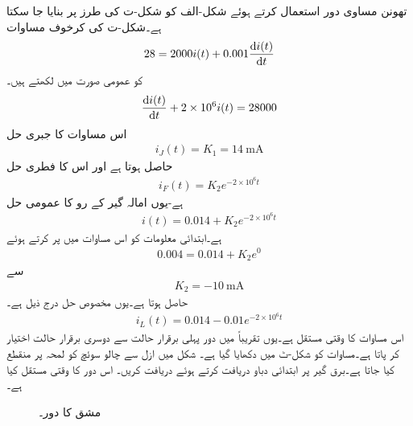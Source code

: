 تھونن مساوی دور استعمال کرتے ہوئے شکل-الف کو شکل-ت کی طرز پر بنایا جا سکتا ہے۔شکل-ت کی کرخوف مساوات
\begin{align*}
28=2000 i(t)+0.001 \frac{\dif i(t)}{\dif t}
\end{align*}
کو عمومی صورت میں لکھتے ہیں۔
\begin{align*}
\frac{\dif i(t)}{\dif t}+2\times 10^6 i(t)=28000
\end{align*}
اس مساوات کا جبری حل 
\begin{align*}
i_J(t)=K_1=\SI{14}{\milli\ampere}
\end{align*}
حاصل ہوتا ہے اور اس کا فطری حل
\begin{align*}
i_F(t)=K_2 e^{-2\times 10^6 t}
\end{align*}
ہے-یوں امالہ گیر کے رو کا عمومی حل
\begin{align*}
i(t)=0.014+K_2 e^{-2\times 10^6 t}
\end{align*}
ہے۔ابتدائی معلومات کو اس مساوات میں پر کرتے ہوئے
\begin{align*}
0.004=0.014+K_2 e^{0}
\end{align*}
سے
\begin{align*}
K_2=\SI{-10}{\milli\ampere}
\end{align*}
حاصل ہوتا ہے۔یوں مخصوص حل درج ذیل ہے۔
\begin{align}\label{مساوات_عارضی_امالہ_گیر_مکمل_حل_ب}
i_L(t)=0.014-0.01e^{-2\times 10^6 t}
\end{align} 
اس مساوات کا وقتی مستقل  ہے۔یوں تقریباً  میں دور پہلی برقرار حالت سے دوسری برقرار حالت اختیار کر پاتا ہے۔مساوات  کو شکل-ٹ میں دکھایا گیا ہے۔
شکل  میں ازل سے چالو سوئچ کو  لمحہ  پر منقطع کیا جاتا ہے۔برق گیر پر ابتدائی دباو دریافت کرتے ہوئے  دریافت کریں۔ اس دور کا وقتی مستقل کیا ہے۔
\begin{figure}
\centering
{}
\caption{مشق  کا دور۔}
\label{شکل_عارضی_مشق_برق_گیر_الف}
\end{figure}

